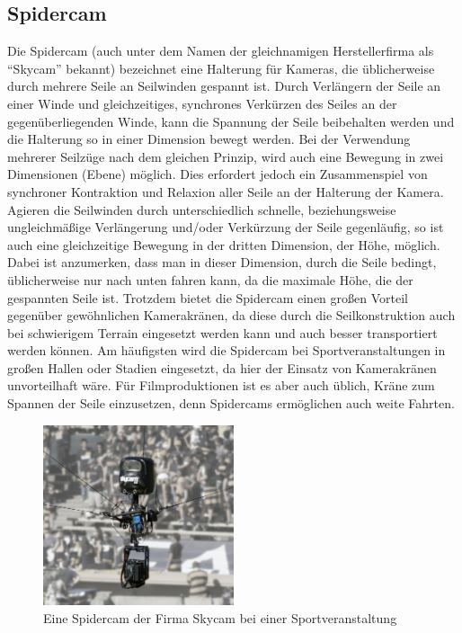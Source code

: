\documentclass[a4paper, 12pt, bibtotocnumbered, liststotocnumbered]{scrartcl}
\begin{document}
	\subsection{Spidercam}
	Die Spidercam (auch unter dem Namen der gleichnamigen Herstellerfirma als “Skycam” bekannt) bezeichnet eine Halterung für Kameras, die üblicherweise durch mehrere Seile an Seilwinden gespannt ist. Durch Verlängern der Seile an einer Winde und gleichzeitiges, synchrones Verkürzen des Seiles an der gegenüberliegenden Winde, kann die Spannung der Seile beibehalten werden und die Halterung so in einer Dimension bewegt werden. Bei der Verwendung mehrerer Seilzüge nach dem gleichen Prinzip, wird auch eine Bewegung in zwei Dimensionen (Ebene) möglich. Dies erfordert jedoch ein Zusammenspiel von synchroner Kontraktion und Relaxion aller Seile an der Halterung der Kamera. Agieren die Seilwinden durch unterschiedlich schnelle, beziehungsweise ungleichmäßige Verlängerung und/oder Verkürzung der Seile gegenläufig, so ist auch eine gleichzeitige Bewegung in der dritten Dimension, der Höhe, möglich. Dabei ist anzumerken, dass man in dieser Dimension, durch die Seile bedingt, üblicherweise nur nach unten fahren kann, da die maximale Höhe, die der gespannten Seile ist. Trotzdem bietet die Spidercam einen großen Vorteil gegenüber gewöhnlichen Kamerakränen, da diese durch die Seilkonstruktion auch bei schwierigem Terrain eingesetzt werden kann und auch besser transportiert werden können. Am häufigsten wird die Spidercam bei Sportveranstaltungen in großen Hallen oder Stadien eingesetzt, da hier der Einsatz von Kamerakränen unvorteilhaft wäre. Für Filmproduktionen ist es aber auch üblich, Kräne zum Spannen der Seile einzusetzen, denn Spidercams ermöglichen auch weite Fahrten.
	
	\begin{figure}[!htb]
		\centering
		\includegraphics[width=0.5\textwidth]{Bilder/SkycamHDClipEnhanced0346}
		\caption{Eine Spidercam der Firma Skycam bei einer Sportveranstaltung}
	\end{figure}
\end{document}

